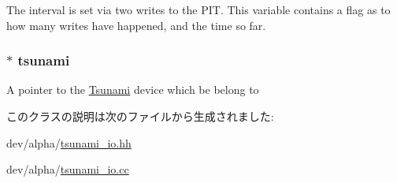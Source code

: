 \label{classTsunamiIO_ac2f6e48e9ea7cdd01d0d4855725107d6}
The interval is set via two writes to the PIT. This variable contains a flag as to how many writes have happened, and the time so far. \hypertarget{classTsunamiIO_aa178467f241f875a068722413f62ec20}{
\subsubsection[{tsunami}]{$\ast$ {\bf tsunami}}}
\label{classTsunamiIO_aa178467f241f875a068722413f62ec20}
A pointer to the \hyperlink{classTsunami}{Tsunami} device which be belong to 

このクラスの説明は次のファイルから生成されました:\begin{DoxyCompactItemize}
\item 
dev/alpha/\hyperlink{tsunami__io_8hh}{tsunami\_\-io.hh}\item 
dev/alpha/\hyperlink{tsunami__io_8cc}{tsunami\_\-io.cc}\end{DoxyCompactItemize}

